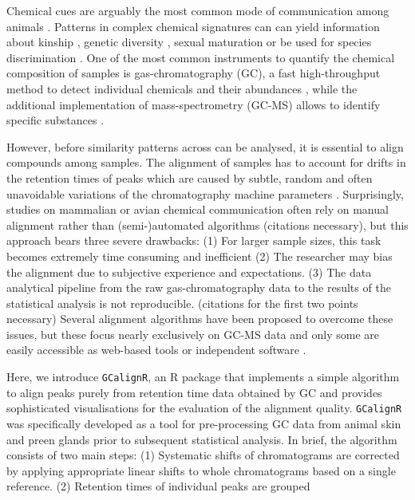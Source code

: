 Chemical cues are arguably the most common mode of communication among
animals \citep{Wyatt.2014}. Patterns in complex chemical signatures can
can yield information about kinship \citep{Krause.2012, Stoffel.2015},
genetic diversity \citep{Charpentier.2010, Leclaire.2012}, sexual
maturation \citep{Caspers.2011} or be used for species discrimination
\citep{Meulemeester.2011}. One of the most common instruments to
quantify the chemical composition of samples is gas-chromatography (GC),
a fast high-throughput method to detect individual chemicals and their
abundances \citep{McNair.2011}, while the additional implementation of
mass-spectrometry (GC-MS) allows to identify specific substances
\citep{Caspers.2011}. \par
However, before similarity patterns across can be analysed, it is
essential to align compounds among samples. The alignment of samples has
to account for drifts in the retention times of peaks which are caused
by subtle, random and often unavoidable variations of the chromatography
machine parameters \citep{Pierce.2005}. Surprisingly, studies on
mammalian or avian chemical communication often rely on manual alignment
rather than (semi-)automated algorithms (citations necessary), but this
approach bears three severe drawbacks: (1) For larger sample sizes, this
task becomes extremely time consuming and inefficient (2) The researcher
may bias the alignment due to subjective experience and expectations.
(3) The data analytical pipeline from the raw gas-chromatography data to
the results of the statistical analysis is not reproducible. (citations
for the first two points necessary) Several alignment algorithms have
been proposed to overcome these issues, but these focus nearly
exclusively on GC-MS data \citep{Pierce.2005, Robinson.2007,Jiang.2013}
and only some are easily accessible as web-based tools
\citep{Hoffmann.2009, Wang.2010} or independent software
\citep{Dellicour.2013}. \par
Here, we introduce \texttt{GCalignR}, an R package that implements a
simple algorithm to align peaks purely from retention time data obtained
by GC and provides sophisticated visualisations for the evaluation of
the alignment quality. \texttt{GCalignR} was specifically developed as a
tool for pre-processing GC data from animal skin and preen glands prior
to subsequent statistical analysis. In brief, the algorithm consists of
two main steps: (1) Systematic shifts of chromatograms are corrected by
applying appropriate linear shifts to whole chromatograms based on a
single reference. (2) Retention times of individual peaks are grouped
